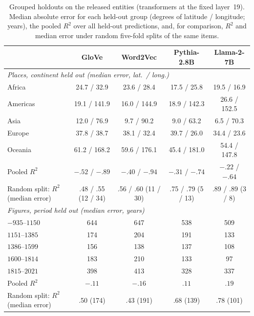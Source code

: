 \documentclass[11pt]{article}
\begin{document}
\begin{table}[t]
  \centering
  \caption{Grouped holdouts on the released entities (transformers at the fixed layer~19). Median
  absolute error for each held-out group (degrees of latitude / longitude; years), the
  pooled $R^2$ over all held-out predictions, and, for comparison, $R^2$ and median error
  under random five-fold splits of the same items.}
  \label{tab:grouped_holdout}
  \footnotesize
  \setlength{\tabcolsep}{4pt}
  \begin{tabular}{lcccc}
    \toprule
    & GloVe & Word2Vec & Pythia-2.8B & Llama-2-7B \\
    \midrule
    \multicolumn{5}{l}{\emph{Places, continent held out (median error, lat.\ / long.)}} \\
    Africa        & 24.7 / 32.9 & 23.6 / 28.4 & 17.5 / 25.8 & 19.5 / 16.9 \\
    Americas      & 19.1 / 141.9 & 16.0 / 144.9 & 18.9 / 142.3 & 26.6 / 152.5 \\
    Asia          & 12.0 / 76.9 & 9.7 / 90.2 & 9.0 / 63.2 & 6.5 / 70.3 \\
    Europe        & 37.8 / 38.7 & 38.1 / 32.4 & 39.7 / 26.0 & 34.4 / 23.6 \\
    Oceania       & 61.2 / 168.2 & 59.6 / 176.1 & 45.4 / 181.0 & 54.4 / 147.8 \\
    Pooled $R^2$  & $-.52$ / $-.89$ & $-.40$ / $-.94$ & $-.31$ / $-.74$ & $-.22$ / $-.64$ \\
    Random split: $R^2$ (median error) & .48 / .55 (12 / 34) & .56 / .60 (11 / 30) & .75 / .79 (5 / 13) & .89 / .89 (3 / 8) \\
    \midrule
    \multicolumn{5}{l}{\emph{Figures, period held out (median error, years)}} \\
    $-935$--$1150$ & 644 & 647 & 538 & 509 \\
    $1151$--$1385$ & 174 & 204 & 191 & 133 \\
    $1386$--$1599$ & 156 & 138 & 137 & 108 \\
    $1600$--$1814$ & 183 & 210 & 133 & 97 \\
    $1815$--$2021$ & 398 & 413 & 328 & 337 \\
    Pooled $R^2$  & $-.11$ & $-.16$ & $.11$ & $.19$ \\
    Random split: $R^2$ (median error) & .50 (174) & .43 (191) & .68 (139) & .78 (101) \\
    \bottomrule
  \end{tabular}
\end{table}
\end{document}
